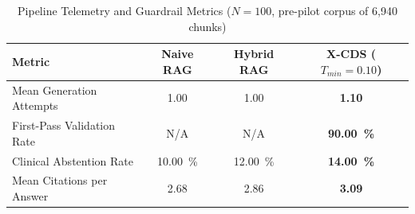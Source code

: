 \begin{table}[htbp]
\centering
\caption{Pipeline Telemetry and Guardrail Metrics ($N=100$, pre-pilot corpus of 6,940 chunks)}
\label{tab:telemetry}
\begin{tabular}{lccc}
\toprule
Metric & Naive RAG & Hybrid RAG & X-CDS ($T_{min}{=}0.10$) \\
\midrule
Mean Generation Attempts & 1.00 & 1.00 & \textbf{1.10} \\
First-Pass Validation Rate & N/A & N/A & \textbf{\SI{90.00}{\percent}} \\
Clinical Abstention Rate & \SI{10.00}{\percent} & \SI{12.00}{\percent} & \textbf{\SI{14.00}{\percent}} \\
Mean Citations per Answer & 2.68 & 2.86 & \textbf{3.09} \\
\bottomrule
\end{tabular}
\end{table}
